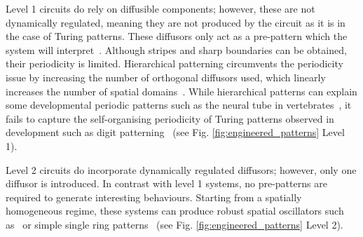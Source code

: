 Level 1 circuits do rely on diffusible components; however, these are not dynamically regulated, meaning they are not produced by the circuit as it is in the case of Turing patterns.
These diffusors only act as a pre-pattern which the system will interpret~\parencite{Basu2005, Schaerli2014, Kong2017, Barbier2020, Grant2020}.
Although stripes and sharp boundaries can be obtained, their periodicity is limited.
Hierarchical patterning circumvents the periodicity issue by increasing the number of orthogonal diffusors used, which linearly increases the number of spatial domains~\parencite{Boehm2018}.
While hierarchical patterns can explain some developmental periodic patterns such as the neural tube in vertebrates~\parencite{Briscoe2015}, it fails to capture the self-organising periodicity of Turing patterns observed in development such as digit patterning~\parencite{Sheth2012,Raspopovic1} (see Fig. \ref{fig:engineered_patterns} Level 1).

Level 2 circuits do incorporate dynamically regulated diffusors; however, only one diffusor is introduced.
In contrast with level 1 systems, no pre-patterns are required to generate interesting behaviours.
Starting from a spatially homogeneous regime, these systems can produce robust spatial oscillators such as~\parencite{Danino2010} or simple single ring patterns~\parencite{Cao2016, Payne2013} (see Fig. \ref{fig:engineered_patterns} Level 2).

